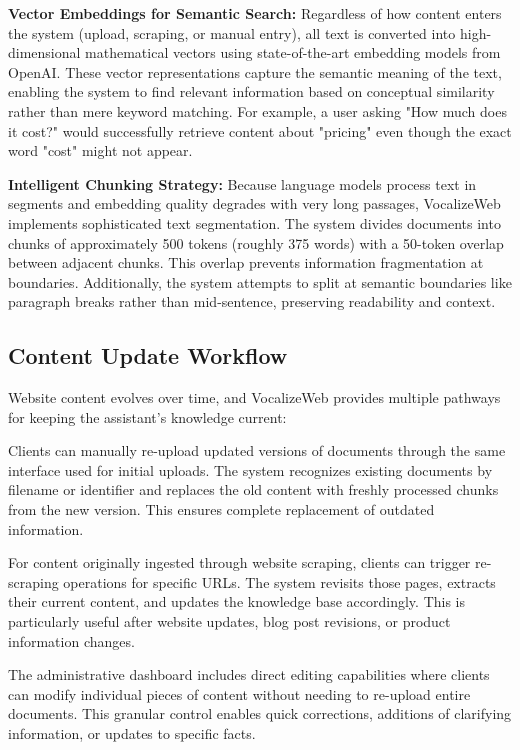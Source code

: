 \textbf{Vector Embeddings for Semantic Search:} Regardless of how content enters the system (upload, scraping, or manual entry), all text is converted into high-dimensional mathematical vectors using state-of-the-art embedding models from OpenAI. These vector representations capture the semantic meaning of the text, enabling the system to find relevant information based on conceptual similarity rather than mere keyword matching. For example, a user asking "How much does it cost?" would successfully retrieve content about "pricing" even though the exact word "cost" might not appear.

\textbf{Intelligent Chunking Strategy:} Because language models process text in segments and embedding quality degrades with very long passages, VocalizeWeb implements sophisticated text segmentation. The system divides documents into chunks of approximately 500 tokens (roughly 375 words) with a 50-token overlap between adjacent chunks. This overlap prevents information fragmentation at boundaries. Additionally, the system attempts to split at semantic boundaries like paragraph breaks rather than mid-sentence, preserving readability and context.

\subsection{Content Update Workflow}

Website content evolves over time, and VocalizeWeb provides multiple pathways for keeping the assistant's knowledge current:

Clients can manually re-upload updated versions of documents through the same interface used for initial uploads. The system recognizes existing documents by filename or identifier and replaces the old content with freshly processed chunks from the new version. This ensures complete replacement of outdated information.

For content originally ingested through website scraping, clients can trigger re-scraping operations for specific URLs. The system revisits those pages, extracts their current content, and updates the knowledge base accordingly. This is particularly useful after website updates, blog post revisions, or product information changes.

The administrative dashboard includes direct editing capabilities where clients can modify individual pieces of content without needing to re-upload entire documents. This granular control enables quick corrections, additions of clarifying information, or updates to specific facts.

